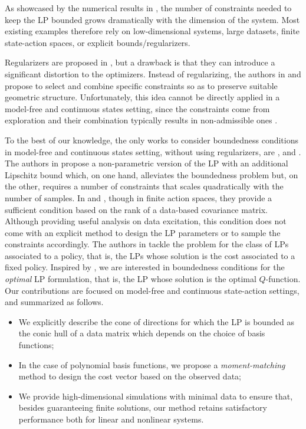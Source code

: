 \documentclass[journal,twoside,web]{ieeecolor}
\newcommand{\review}{\color{black}}
\begin{document}
As showcased by the numerical results in \cite{RelaxedBellmanOp}, the number of constraints needed to keep the LP bounded grows dramatically with the dimension of the system. Most existing examples therefore rely on low-dimensional systems, large datasets, finite state-action spaces, or explicit bounds/regularizers. {\review Regularizers are proposed in \cite{SutterCDC2017,deFariasConstraintSampling,petrik2010feature_selection}, but a drawback is that they can introduce a significant distortion to the optimizers. Instead of regularizing, the authors in \cite{lakshminarayanan2018linearly_relaxed_alp} and \cite{shariff2020efficient_planning} propose to select and combine specific constraints so as to preserve suitable geometric structure. Unfortunately, this idea cannot be directly applied in a model-free and continuous states setting, since the constraints come from exploration and their combination typically results in non-admissible ones \cite{AndreaSynthesisBellmanIneq}. 

To the best of our knowledge, the only works to consider boundedness conditions in model-free and continuous states setting, without using regularizers, are \cite{pazis2011nonparametric_alp}, \cite{CDC22_meyn} and \cite{CDC23_meyn_stoch}. The authors in \cite{pazis2011nonparametric_alp} propose a non-parametric version of the LP with an additional Lipschitz bound which, on one hand, alleviates the boundedness problem but, on the other, requires a number of constraints that scales quadratically with the number of samples. In \cite{CDC22_meyn} and \cite{CDC23_meyn_stoch}, though in finite action spaces, they provide a sufficient condition based on the rank of a data-based covariance matrix. Although providing useful analysis on data excitation, this condition does not come with an explicit method to design the LP parameters or to sample the constraints accordingly. The authors in \cite{LuciaBounded} tackle the problem for the class of LPs associated to a policy, that is, the LPs whose solution is the cost associated to a fixed policy. {\review Inspired by \cite{LuciaBounded},} we are interested in boundedness conditions for the \textit{optimal} LP formulation, that is, the LP whose solution is the optimal $Q$-function. Our contributions are focused on model-free and continuous state-action settings, and summarized as follows.}
%
\begin{itemize}
    \item[i.] We explicitly describe the cone of directions for which the LP is bounded as the conic hull of a data matrix which depends on the choice of basis functions;
    \item[ii.] In the case of polynomial basis functions, we propose a \textit{moment-matching} method to design the cost vector based on the observed data;
    \item[iii.] We provide high-dimensional simulations with minimal data to ensure that, besides guaranteeing finite solutions, our method retains {\review satisfactory} performance both for linear and nonlinear systems.
\end{itemize}
\end{document}
